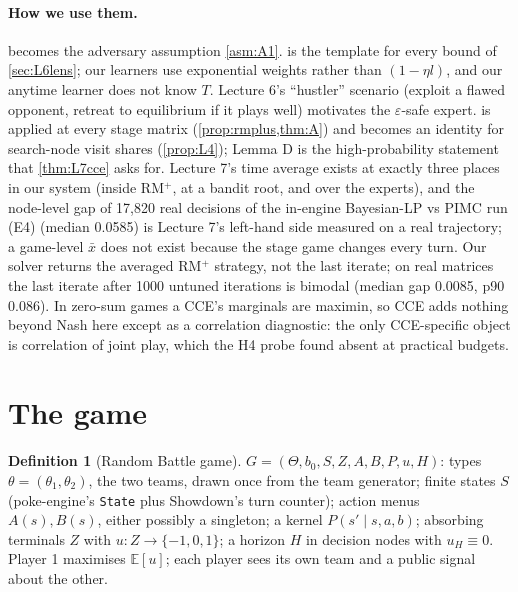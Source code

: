\documentclass[10pt]{article}
\theoremstyle{plain}
\theoremstyle{definition}
\newtheorem{definition}[theorem]{Definition}
\theoremstyle{remark}
\newcommand{\E}{\mathbb{E}}
\begin{document}
\paragraph{How we use them.}  becomes the adversary assumption \cref{asm:A1}.  is the
template for every bound of \cref{sec:L6lens}; our learners use exponential weights rather than $(1-\eta l)$, and our
anytime learner does not know $T$. Lecture 6's ``hustler'' scenario (exploit a flawed opponent, retreat to equilibrium if
it plays well) motivates the $\varepsilon$-safe expert.  is applied at every stage matrix
(\cref{prop:rmplus,thm:A}) and becomes an identity for search-node visit shares (\cref{prop:L4}); Lemma D is the
high-probability statement that \cref{thm:L7cce} asks for. Lecture 7's time average exists at exactly three places in our
system (inside RM$^+$, at a bandit root, and over the experts), and the node-level gap of 17,820 real decisions of the in-engine Bayesian-LP vs PIMC run (E4) (median
0.0585) is Lecture 7's left-hand side measured on a real trajectory; a game-level $\bar x$ does not exist because the
stage game changes every turn. Our solver returns the averaged RM$^+$ strategy, not the last
iterate; on real matrices the last iterate after 1000 untuned iterations is bimodal (median gap 0.0085, p90 0.086). In
zero-sum games a CCE's marginals are maximin, so CCE adds nothing beyond Nash here except as a correlation
diagnostic: the only CCE-specific object is correlation of joint play, which the H4 probe found absent at practical budgets.

\section{The game}\label{sec:game}

\begin{definition}[Random Battle game]\label{def:game}
$G=(\Theta,b_0,S,Z,A,B,P,u,H)$: types $\theta=(\theta_1,\theta_2)$, the two teams, drawn once from the team generator;
finite states $S$ (poke-engine's \texttt{State} plus Showdown's turn counter); action menus $A(s),B(s)$, either
possibly a singleton; a kernel $P(s'\mid s,a,b)$; absorbing terminals $Z$ with $u:Z\to\{-1,0,1\}$; a horizon $H$ in
decision nodes with $u_H\equiv0$. Player 1 maximises $\E[u]$; each player sees its own team and a public signal about
the other.
\end{definition}
\end{document}
